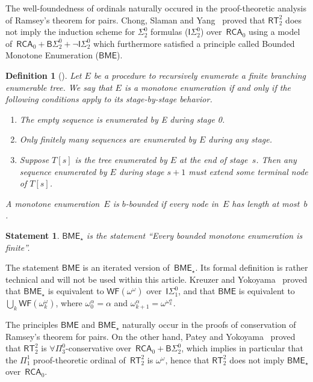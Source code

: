 \documentclass{article}
\numberwithin{theorem}{section}
\newtheorem{statement}[theorem]{Statement}
\newtheorem{definition}[theorem]{Definition}
\newcommand{\RCA}{\mathsf{RCA}}
\newcommand{\BSig}{\mathsf{B}\Sigma^0}
\newcommand{\ISig}{\mathsf{I}\Sigma^0}
\newcommand{\WF}{\mathsf{WF}}
\newcommand{\RT}{\mathsf{RT}}
\newcommand{\BME}{\mathsf{BME}}
\def\qt#1{``#1''}%
\begin{document}
The well-foundedness of ordinals naturally occured in the proof-theoretic analysis of Ramsey's theorem for pairs. Chong, Slaman and Yang~\cite{chong2017inductive} proved that $\RT^2_2$ does not imply the induction scheme for $\Sigma^0_2$ formulas ($\ISig_2$) over~$\RCA_0$ using a model of~$\RCA_0 + \BSig_2 + \neg \ISig_2$ which furthermore satisfied a principle called Bounded Monotone Enumeration ($\BME$).

\begin{definition}[\cite{chong2017inductive}]
Let $E$ be a procedure to recursively enumerate a finite branching enumerable tree. We say that $E$ is a \emph{monotone enumeration} if and only if the following conditions apply to its stage-by-stage behavior. 
\begin{enumerate}
    \item[(1)] The empty sequence is enumerated by E during stage 0.
    \item[(2)] Only finitely many sequences are enumerated by $E$ during any stage.
    \item[(3)] Suppose $T[s]$ is the tree enumerated by $E$ at the end of stage~$s$. Then any sequence enumerated by $E$ during stage $s + 1$ must extend some terminal node of $T[s]$.
\end{enumerate}
A monotone enumeration~$E$ is \emph{$b$-bounded} if every node in~$E$ has length at most~$b$.
\end{definition}

\begin{statement}
$\BME_{\star}$ is the statement \qt{Every bounded monotone enumeration is finite}.
\end{statement}

The statement $\BME$ is an iterated version of~$\BME_{\star}$. Its formal definition is rather technical and will not be used within this article.
Kreuzer and Yokoyama~\cite{kreuzer2016principles} proved that $\BME_{\star}$ is equivalent to $\WF(\omega^\omega)$ over~$\ISig_1$, and that $\BME$ is equivalent to $\bigcup_k \WF(\omega^\omega_k)$, where $\omega^\alpha_0 = \alpha$ and $\omega^{\alpha}_{k+1} = \omega^{\omega_k^\alpha}$. 

The principles $\BME$ and $\BME_\star$ naturally occur in the proofs of conservation of Ramsey's theorem for pairs. On the other hand, Patey and Yokoyama~\cite{patey2018proof} proved that $\RT^2_2$ is $\forall \Pi^0_3$-conservative over~$\RCA_0 + \BSig_2$, which implies in particular that the $\Pi^1_1$ proof-theoretic ordinal of~$\RT^2_2$ is $\omega^\omega$, hence that $\RT^2_2$ does not imply $\BME_\star$ over~$\RCA_0$.
\end{document}
